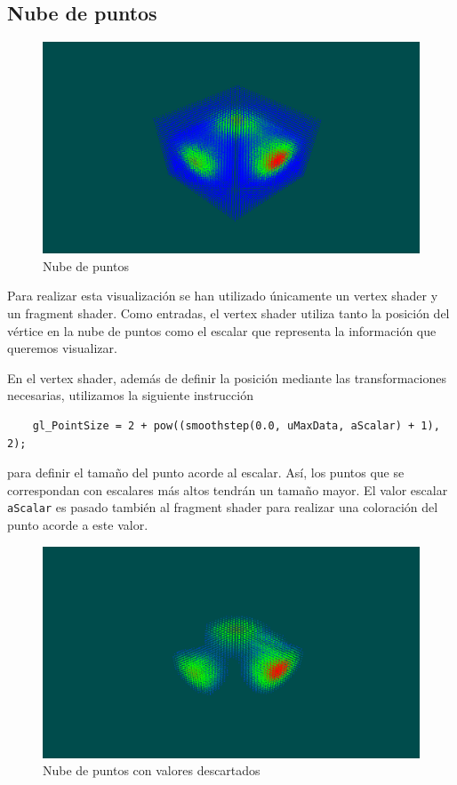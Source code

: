 \subsection{Nube de puntos}
\label{makereference5.5.5}

\begin{figure}[h]
	\centering	
	\includegraphics[width=\textwidth]{figures/mycloud.png}
	\caption{Nube de puntos}
	\label{fig:mycloud}
\end{figure}

Para realizar esta visualización se han utilizado únicamente un vertex shader y
un fragment shader. Como entradas, el vertex shader utiliza tanto la posición
del vértice en la nube de puntos como el escalar que representa la información
que queremos visualizar. 

En el vertex shader, además de definir la posición mediante las transformaciones
necesarias, utilizamos la siguiente instrucción

\begin{verbatim}
    gl_PointSize = 2 + pow((smoothstep(0.0, uMaxData, aScalar) + 1), 2);
\end{verbatim}

para definir el tamaño del punto acorde al escalar. Así, los puntos que se
correspondan con escalares más altos tendrán un tamaño mayor. El valor escalar
\verb|aScalar| es pasado también al fragment shader para realizar una coloración
del punto acorde a este valor. 

\begin{figure}[hb]
	\centering	
	\includegraphics[width=\textwidth]{figures/mycloud2.png}
	\caption{Nube de puntos con valores descartados}
	\label{fig:mycloud2}
\end{figure}

